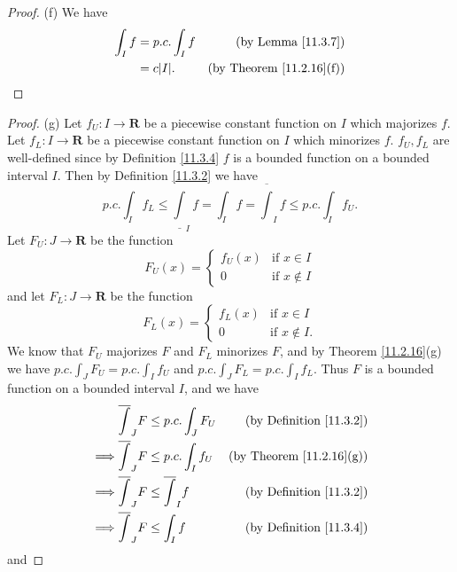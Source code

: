 \begin{proof}{(f)}
    We have
    \begin{align*}
        \int_I f & = p.c. \int_I f & \text{(by Lemma \ref{11.3.7})}       \\
                 & = c \abs*{I}.   & \text{(by Theorem \ref{11.2.16}(f))}
    \end{align*}
\end{proof}

\begin{proof}{(g)}
    Let \(f_U : I \to \mathbf{R}\) be a piecewise constant function on \(I\) which majorizes \(f\).
    Let \(f_L : I \to \mathbf{R}\) be a piecewise constant function on \(I\) which minorizes \(f\).
    \(f_U, f_L\) are well-defined since by Definition \ref{11.3.4} \(f\) is a bounded function on a bounded interval \(I\).
    Then by Definition \ref{11.3.2} we have
    \[
        p.c. \int_I f_L \leq \underline{\int}_I f = \int_I f = \overline{\int}_I f \leq p.c. \int_I f_U.
    \]
    Let \(F_U : J \to \mathbf{R}\) be the function
    \[
        F_U(x) = \begin{cases}
            f_U(x) & \text{if } x \in I    \\
            0      & \text{if } x \notin I
        \end{cases}
    \]
    and let \(F_L : J \to \mathbf{R}\) be the function
    \[
        F_L(x) = \begin{cases}
            f_L(x) & \text{if } x \in I     \\
            0      & \text{if } x \notin I.
        \end{cases}
    \]
    We know that \(F_U\) majorizes \(F\) and \(F_L\) minorizes \(F\), and by Theorem \ref{11.2.16}(g) we have \(p.c. \int_J F_U = p.c. \int_I f_U\) and \(p.c. \int_J F_L = p.c. \int_I f_L\).
    Thus \(F\) is a bounded function on a bounded interval \(I\), and we have
    \begin{align*}
                 & \overline{\int}_J F \leq p.c. \int_J F_U     & \text{(by Definition \ref{11.3.2})}  \\
        \implies & \overline{\int}_J F \leq p.c. \int_I f_U     & \text{(by Theorem \ref{11.2.16}(g))} \\
        \implies & \overline{\int}_J F \leq \overline{\int}_I f & \text{(by Definition \ref{11.3.2})}  \\
        \implies & \overline{\int}_J F \leq \int_I f            & \text{(by Definition \ref{11.3.4})}
    \end{align*}
    and

\end{proof}
